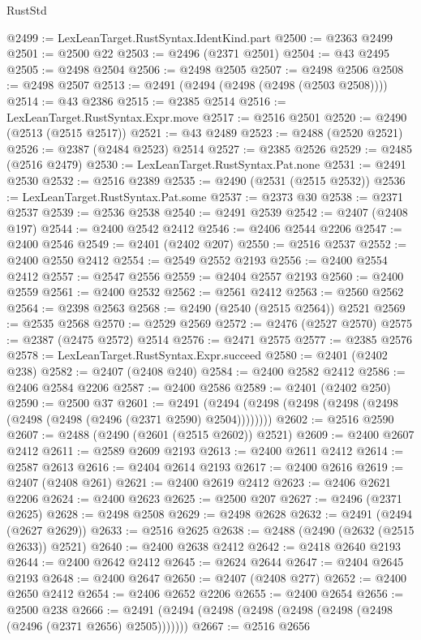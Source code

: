 \begin{lexlean}{RustStd}
\begin{coremodule}
{\begin{coremodule}
{{{{{{{{{{{{{{{{{{{{{{{{{{{{{{{{{{{{{{{{{{{{{{{{{{@2499 := LexLeanTarget.RustSyntax.IdentKind.part
@2500 := @2363 @2499
@2501 := @2500 @22
@2503 := @2496 (@2371 @2501)
@2504 := @43 @2495
@2505 := @2498 @2504
@2506 := @2498 @2505
@2507 := @2498 @2506
@2508 := @2498 @2507
@2513 := @2491 (@2494 (@2498 (@2498 (@2503 @2508))))
@2514 := @43 @2386
@2515 := @2385 @2514
@2516 := LexLeanTarget.RustSyntax.Expr.move
@2517 := @2516 @2501
@2520 := @2490 (@2513 (@2515 @2517))
@2521 := @43 @2489
@2523 := @2488 (@2520 @2521)
@2526 := @2387 (@2484 @2523) @2514
@2527 := @2385 @2526
@2529 := @2485 (@2516 @2479)
@2530 := LexLeanTarget.RustSyntax.Pat.none
@2531 := @2491 @2530
@2532 := @2516 @2389
@2535 := @2490 (@2531 (@2515 @2532))
@2536 := LexLeanTarget.RustSyntax.Pat.some
@2537 := @2373 @30
@2538 := @2371 @2537
@2539 := @2536 @2538
@2540 := @2491 @2539
@2542 := @2407 (@2408 @197)
@2544 := @2400 @2542 @2412
@2546 := @2406 @2544 @2206
@2547 := @2400 @2546
@2549 := @2401 (@2402 @207)
@2550 := @2516 @2537
@2552 := @2400 @2550 @2412
@2554 := @2549 @2552 @2193
@2556 := @2400 @2554 @2412
@2557 := @2547 @2556
@2559 := @2404 @2557 @2193
@2560 := @2400 @2559
@2561 := @2400 @2532
@2562 := @2561 @2412
@2563 := @2560 @2562
@2564 := @2398 @2563
@2568 := @2490 (@2540 (@2515 @2564)) @2521
@2569 := @2535 @2568
@2570 := @2529 @2569
@2572 := @2476 (@2527 @2570)
@2575 := @2387 (@2475 @2572) @2514
@2576 := @2471 @2575
@2577 := @2385 @2576
@2578 := LexLeanTarget.RustSyntax.Expr.succeed
@2580 := @2401 (@2402 @238)
@2582 := @2407 (@2408 @240)
@2584 := @2400 @2582 @2412
@2586 := @2406 @2584 @2206
@2587 := @2400 @2586
@2589 := @2401 (@2402 @250)
@2590 := @2500 @37
@2601 := @2491 (@2494 (@2498 (@2498 (@2498 (@2498 (@2498 (@2498 (@2496 (@2371 @2590) @2504))))))))
@2602 := @2516 @2590
@2607 := @2488 (@2490 (@2601 (@2515 @2602)) @2521)
@2609 := @2400 @2607 @2412
@2611 := @2589 @2609 @2193
@2613 := @2400 @2611 @2412
@2614 := @2587 @2613
@2616 := @2404 @2614 @2193
@2617 := @2400 @2616
@2619 := @2407 (@2408 @261)
@2621 := @2400 @2619 @2412
@2623 := @2406 @2621 @2206
@2624 := @2400 @2623
@2625 := @2500 @207
@2627 := @2496 (@2371 @2625)
@2628 := @2498 @2508
@2629 := @2498 @2628
@2632 := @2491 (@2494 (@2627 @2629))
@2633 := @2516 @2625
@2638 := @2488 (@2490 (@2632 (@2515 @2633)) @2521)
@2640 := @2400 @2638 @2412
@2642 := @2418 @2640 @2193
@2644 := @2400 @2642 @2412
@2645 := @2624 @2644
@2647 := @2404 @2645 @2193
@2648 := @2400 @2647
@2650 := @2407 (@2408 @277)
@2652 := @2400 @2650 @2412
@2654 := @2406 @2652 @2206
@2655 := @2400 @2654
@2656 := @2500 @238
@2666 := @2491 (@2494 (@2498 (@2498 (@2498 (@2498 (@2498 (@2496 (@2371 @2656) @2505)))))))
@2667 := @2516 @2656
}}}}}}}}}}}}}}}}}}}}}}}}}}}}}}}}}}}}}}}}}}}}}}}}}}
\end{coremodule}}
\end{coremodule}
\end{lexlean}

